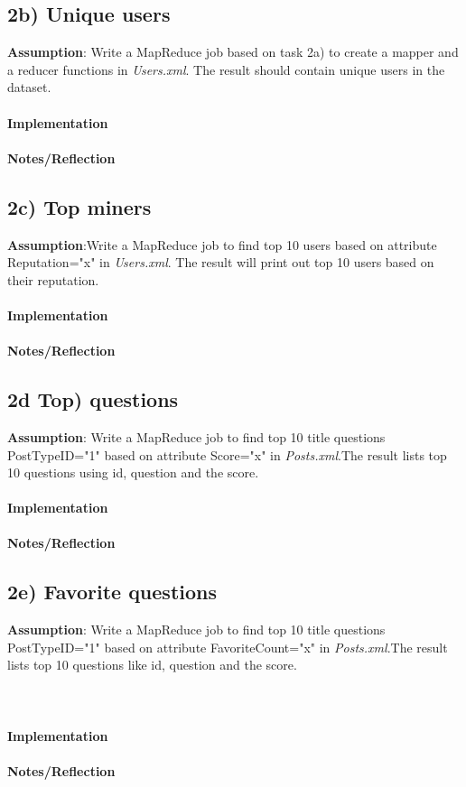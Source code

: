 \documentclass[fleqn,10pt]{wlscirep}
\begin{document}
\subsection*{2b) Unique users }
\textbf{Assumption}: Write a MapReduce job based on task 2a) to create a mapper  and a reducer functions in \textit{Users.xml}. The result should contain unique users in the dataset.  \\ \\
\textbf{Implementation}  \\ \\
\textbf{Notes/Reflection}


\subsection*{2c) Top miners }
\textbf{Assumption}:Write a MapReduce job to find top 10 users based on attribute Reputation="x" in \textit{Users.xml}. The result will print out top 10 users based on their reputation. \\ \\
\textbf{Implementation}  \\ \\
\textbf{Notes/Reflection}


\subsection*{2d Top) questions }
\textbf{Assumption}: Write a MapReduce job to find top 10 title questions PostTypeID="1"  based on attribute Score="x" in \textit{Posts.xml}.The result lists top 10 questions using id, question and the score.\\ \\
\textbf{Implementation}  \\ \\
\textbf{Notes/Reflection}


\subsection*{2e) Favorite questions }
\textbf{Assumption}: Write a MapReduce job to find top 10 title questions PostTypeID="1"  based on attribute FavoriteCount="x" in \textit{Posts.xml}.The result lists top 10 questions like id, question and the score.\\ \\ \\ \\
\textbf{Implementation}  \\ \\
\textbf{Notes/Reflection}
\end{document}
